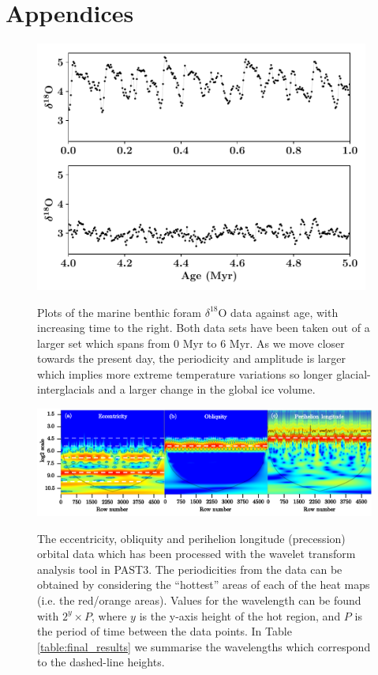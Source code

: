 \documentclass[12pt, onecolumn]{revtex4}    %
\begin{document}
\section*{Appendices}
\begin{figure}[!h]
\begin{center}
\includegraphics[width=11cm]{figures/foram_data}
\caption[]{Plots of the marine benthic foram $\delta^{18}$O data against age, with increasing time to the right. Both data sets have been taken out of a larger set which spans from 0 Myr to 6 Myr. As we move closer towards the present day, the periodicity and amplitude is larger which implies more extreme temperature variations so longer glacial-interglacials and a larger change in the global ice volume.}
\vspace{-3ex}
\label{fig:foram_data}
\end{center}
\end{figure}

\begin{figure}[!h]
\begin{center}
\includegraphics[width=16cm]{figures/wa_orbital_data}
\caption[]{The eccentricity, obliquity and perihelion longitude (precession) orbital data which has been processed with the wavelet transform analysis tool in PAST3. The periodicities from the data can be obtained by considering the ``hottest'' areas of each of the heat maps (i.e. the red/orange areas). Values for the wavelength can be found with $2^y \times P$, where $y$ is the y-axis height of the hot region, and $P$ is the period of time between the data points. In Table \ref{table:final_results} we summarise the wavelengths which correspond to the dashed-line heights.}
\vspace{-3ex}
\label{fig:wa_orbital_data}
\end{center}
\end{figure}
\end{document}
